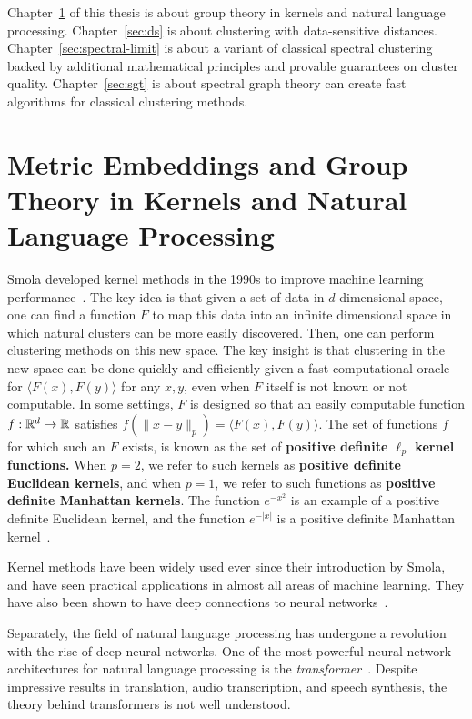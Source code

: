 Chapter~\ref{sec:group} of this thesis is about group theory in kernels and natural language
processing. Chapter~\ref{sec:ds} is about clustering with
data-sensitive distances. Chapter~\ref{sec:spectral-limit} is about
a variant of classical spectral clustering
backed by additional mathematical principles and provable guarantees on
cluster quality. Chapter~\ref{sec:sgt} is about spectral graph
theory can create fast algorithms for classical clustering methods.

\section{Metric Embeddings and Group Theory in Kernels and Natural Language
  Processing}\label{sec:group}
  Smola developed kernel methods in the 1990s to improve machine
  learning performance~\cite{s96}. The key idea is that given a set of
  data in $d$ dimensional space, one
  can find a function $F$ to map this data into an infinite dimensional space in
  which natural clusters can be more easily discovered. Then, one can perform clustering
  methods on this new space. The key insight is that clustering in the
  new space can be done quickly and efficiently given a fast
  computational oracle for $\langle F(x), F(y) \rangle$ for any $x, y$,
  even when $F$ itself is not known or not computable.
  In some settings, $F$ is designed so that an easily computable
  function $f:\mathbb{R}^d \rightarrow {\mathbb R}$ satisfies $f(\|x-y\|_p) = \langle F(x), F(y) \rangle$. The set of
  functions $f$ for which such an $F$ exists, is known as the set of
  \textbf{positive definite $\ell_p$ kernel functions.}  When $p=2$, we
  refer to such kernels as  \textbf{positive definite Euclidean kernels}, and
  when $p=1$, we refer to such functions as \textbf{positive definite Manhattan
  kernels}. The function $e^{-x^2}$ is an example of a positive definite
  Euclidean kernel, and the function $e^{-|x|}$ is a positive definite
  Manhattan kernel~\cite{s42, a80}.

  Kernel methods have been widely used ever since their introduction by
  Smola, and
  have seen practical applications in almost all areas of machine
  learning. They have also been shown to have deep connections to
  neural networks~\cite{d20}.

  Separately, the field of natural language processing has undergone a
  revolution with the rise of deep neural networks. One of the most
  powerful neural network architectures for natural language processing is the
  \textit{transformer}~\cite{transformers}. Despite impressive
  results in translation, audio transcription, and
  speech synthesis, the theory behind transformers is not well understood. 

